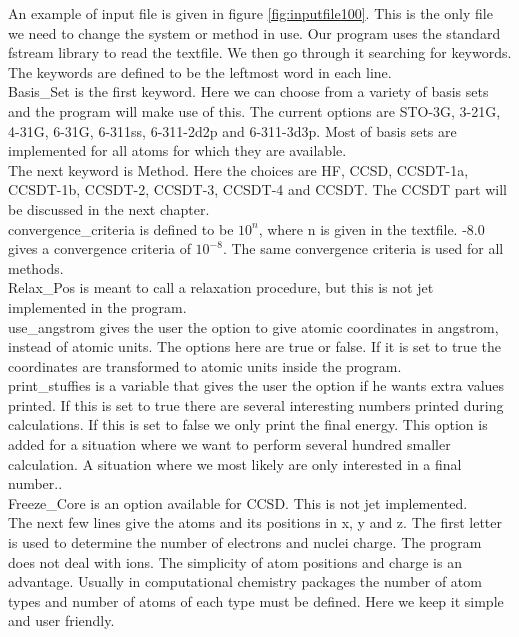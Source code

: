 \documentclass[a4paper,norsk,11pt,twoside]{report}
\begin{document}
An example of input file is given in figure \ref{fig:inputfile100}. This is the only file we need to change the system or method in use. Our program uses the standard fstream library to read the textfile. We then go through it searching for keywords. The keywords are defined to be the leftmost word in each line. \\

Basis\_Set is the first keyword. Here we can choose from a variety of basis sets and the program will make use of this. The current options are STO-3G, 3-21G, 4-31G, 6-31G, 6-311ss, 6-311-2d2p and 6-311-3d3p. Most of basis sets are implemented for all atoms for which they are available. \\

The next keyword is Method. Here the choices are HF, CCSD, CCSDT-1a, CCSDT-1b, CCSDT-2, CCSDT-3, CCSDT-4 and CCSDT. The CCSDT part will be discussed in the next chapter. \\

convergence\_criteria is defined to be $10^{n}$, where n is given in the textfile. -8.0 gives a convergence criteria of $10^{-8}$. The same convergence criteria is used for all methods. \\

Relax\_Pos is meant to call a relaxation procedure, but this is not jet implemented in the program. \\

use\_angstrom gives the user the option to give atomic coordinates in angstrom, instead of atomic units. The options here are true or false. If it is set to true the coordinates are transformed to atomic units inside the program. \\

print\_stuffies is a variable that gives the user the option if he wants extra values printed. If this is set to true there are several interesting numbers printed during calculations. If this is set to false we only print the final energy. This option is added for a situation where we want to perform several hundred smaller calculation. A situation where we most likely are only interested in a final number.. \\

Freeze\_Core is an option available for CCSD. This is not jet implemented. \\

The next few lines give the atoms and its positions in x, y and z. The first letter is used to determine the number of electrons and nuclei charge. The program does not deal with ions. The simplicity of atom positions and charge is an advantage. Usually in computational chemistry packages the number of atom types and number of atoms of each type must be defined. Here we keep it simple and user friendly. \\
\end{document}
